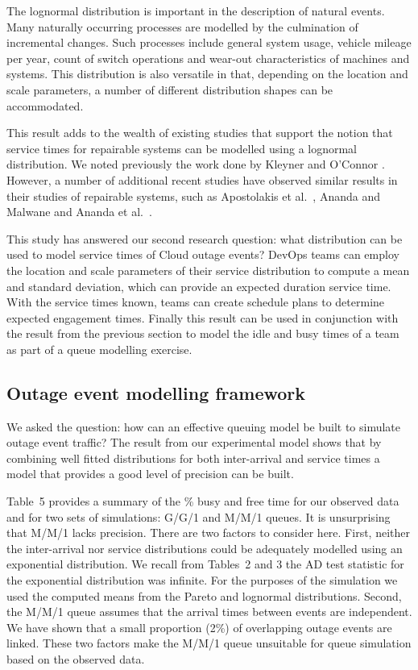 \documentclass[5p]{elsarticle}
\begin{document}
The lognormal distribution is important in the description of natural events. Many naturally occurring processes are modelled by the culmination of incremental changes. Such processes include general system usage, vehicle mileage per year, count of switch operations and wear-out characteristics of machines and systems. This distribution is also versatile in that, depending on the location and scale parameters, a number of different distribution shapes can be accommodated. 

This result adds to the wealth of existing studies that support the notion that service times for repairable systems can be modelled using a lognormal distribution. We noted previously the work done by Kleyner and O'Connor \cite{o2011practical}. However, a number of additional recent studies have observed similar results in their studies of repairable systems, such as Apostolakis et al.~\cite{apostolakis1980synthesis}, Ananda and Malwane \cite{ananda2003confidence} and Ananda et al.~\cite{ananda2004steady}. 

This study has answered our second research question: what distribution can be used to model service times of Cloud outage events? DevOps teams can employ the location and scale parameters of their service distribution to compute a mean and standard deviation, which can provide an expected duration service time. With the service times known, teams can create schedule plans to determine expected engagement times. Finally this result can be used in conjunction with the result from the previous section to model the idle and busy times of a team as part of a queue modelling exercise.


\subsection{Outage event modelling framework}

We asked the question: how can an effective queuing model be built to simulate outage event traffic? The result from our experimental model shows that by combining well fitted distributions for both inter-arrival and service times a model that provides a good level of precision can be built.

Table~5 provides a summary of the \% busy and free time for our observed data and for two sets of simulations: G/G/1 and M/M/1 queues. It is unsurprising that M/M/1 lacks precision. There are two factors to consider here. First, neither the inter-arrival nor service distributions could be adequately modelled using an exponential distribution. We recall from Tables~2 and 3 the AD test statistic for the exponential distribution was infinite. For the purposes of the simulation we used the computed means from the Pareto and lognormal distributions. Second, the M/M/1 queue assumes that the arrival times between events are independent. We have shown that a small proportion (2\%) of overlapping outage events are linked. These two factors make the M/M/1 queue unsuitable for queue simulation based on the observed data.
\end{document}
